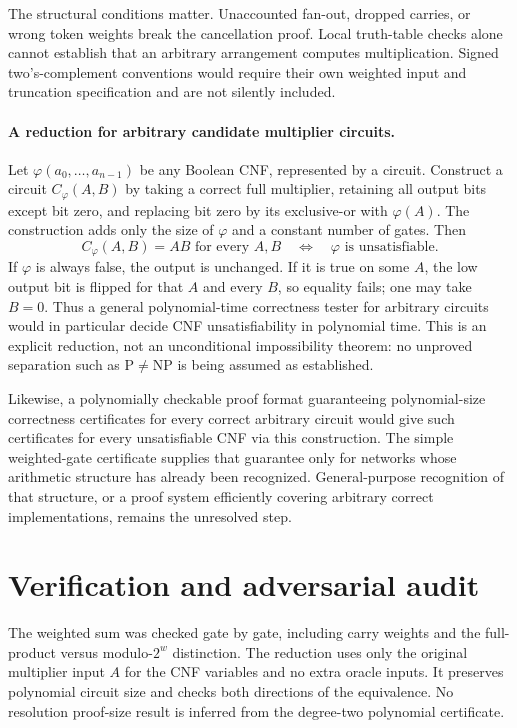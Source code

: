\documentclass[11pt]{article}
\begin{document}
The structural conditions matter. Unaccounted fan-out, dropped carries, or wrong token weights break the cancellation proof. Local truth-table checks alone cannot establish that an arbitrary arrangement computes multiplication. Signed two's-complement conventions would require their own weighted input and truncation specification and are not silently included.

\paragraph{A reduction for arbitrary candidate multiplier circuits.}
Let $\varphi(a_0,\ldots,a_{n-1})$ be any Boolean CNF, represented by a circuit. Construct a circuit $C_\varphi(A,B)$ by taking a correct full multiplier, retaining all output bits except bit zero, and replacing bit zero by its exclusive-or with $\varphi(A)$. The construction adds only the size of $\varphi$ and a constant number of gates. Then
\[
 C_\varphi(A,B)=AB\text{ for every }A,B
 \quad\Longleftrightarrow\quad \varphi\text{ is unsatisfiable}.
\]
If $\varphi$ is always false, the output is unchanged. If it is true on some $A$, the low output bit is flipped for that $A$ and every $B$, so equality fails; one may take $B=0$. Thus a general polynomial-time correctness tester for arbitrary circuits would in particular decide CNF unsatisfiability in polynomial time. This is an explicit reduction, not an unconditional impossibility theorem: no unproved separation such as $\mathrm P\ne\mathrm{NP}$ is being assumed as established.

Likewise, a polynomially checkable proof format guaranteeing polynomial-size correctness certificates for every correct arbitrary circuit would give such certificates for every unsatisfiable CNF via this construction. The simple weighted-gate certificate supplies that guarantee only for networks whose arithmetic structure has already been recognized. General-purpose recognition of that structure, or a proof system efficiently covering arbitrary correct implementations, remains the unresolved step.
\section{Verification and adversarial audit}
The weighted sum was checked gate by gate, including carry weights and the full-product versus modulo-$2^w$ distinction. The reduction uses only the original multiplier input $A$ for the CNF variables and no extra oracle inputs. It preserves polynomial circuit size and checks both directions of the equivalence. No resolution proof-size result is inferred from the degree-two polynomial certificate.
\end{document}
